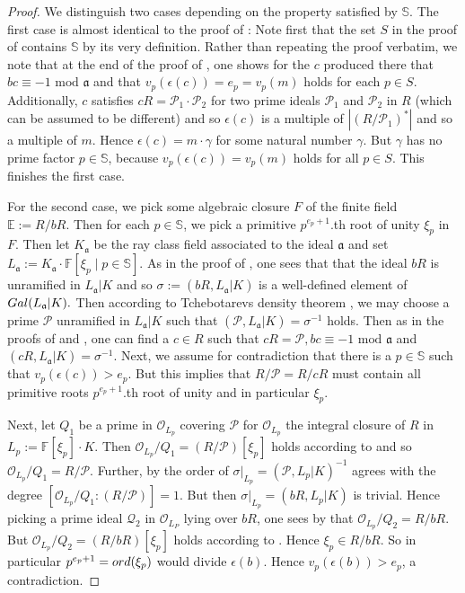 \documentclass[12pt]{amsart}
\newcommand{\C}[1]{{\mathcal #1}}
\theoremstyle{definition}\newtheorem{definition}[theorem]{Definition}
\theoremstyle{remark}\newtheorem{remark}[theorem]{Remark}
\theoremstyle{definition}\newtheorem{case}{Case}
\begin{document}
\begin{proof}
We distinguish two cases depending on the property satisfied by $\mathbb{S}$. The first case is almost identical to the proof of \cite[Lemma~3.3]{https://doi.org/10.1112/blms.12925}: Note first that the set $S$ in the proof of \cite[Lemma~3.3]{https://doi.org/10.1112/blms.12925} contains $\mathbb{S}$ by its very definition. Rather than repeating the proof verbatim, we note that at the end of the proof of \cite[Lemma~3.3]{https://doi.org/10.1112/blms.12925}, one shows for the $c$ produced there that $bc\equiv -1\text{ mod }\mathfrak{a}$ and that $v_p(\epsilon(c))=e_p=v_p(m)$ holds for each 
$p\in S$. Additionally, $c$ satisfies $cR=\C P_1\cdot\C P_2$ for two prime ideals $\C P_1$ and $\C P_2$ in $R$ (which can be assumed to be different) and so $\epsilon(c)$ is a multiple of $|(R/\C P_1)^*|$ and so a multiple of $m.$ Hence $\epsilon(c)=m\cdot\gamma$ for some natural number $\gamma.$ But $\gamma$ has no prime factor $p\in\mathbb{S}$, because $v_p(\epsilon(c))=v_p(m)$ holds for all $p\in S$. This finishes the first case.

For the second case, we pick some algebraic closure $F$ of the finite field $\mathbb{E}:=R/bR$. Then for each $p\in\mathbb{S}$, we pick a primitive $p^{e_p+1}$.th root of unity $\xi_p$ in $F.$ Then let $K_{\mathfrak{a}}$ be the ray class field associated to the ideal $\mathfrak{a}$ and set $L_{\mathfrak{a}}:=K_{\mathfrak{a}}\cdot\mathbb{F}[\xi_p\mid p\in\mathbb{S}].$ As in the proof of \cite[Lemma~3.3]{https://doi.org/10.1112/blms.12925}, one sees that that the ideal $bR$ is unramified in $L_{\mathfrak{a}}|K$ and so $\sigma:=(bR,L_{\mathfrak{a}}|K)$ is a well-defined element of ${\rm Gal}(L_{\mathfrak{a}}|K).$ Then according to Tchebotarevs density theorem \cite[Theorem~9.13A]{MR1876657}, we may choose a prime $\C P$ unramified in $L_{\mathfrak{a}}|K$ such that $(\C P,L_{\mathfrak{a}}|K)=\sigma^{-1}$ holds. Then as in the proofs of \cite[Lemma~4.3]{gvozdevsky2023width} and \cite[Lemma~3.3]{https://doi.org/10.1112/blms.12925}, one can find a $c\in R$ such that $cR=\C P,bc\equiv -1\text{ mod }\mathfrak{a}$ and $(cR,L_{\mathfrak{a}}|K)=\sigma^{-1}$. Next, we assume for contradiction that there is a $p\in\mathbb{S}$ such that $v_p(\epsilon(c))>e_p.$ But this implies that $R/\C P=R/cR$ must contain all primitive roots $p^{e_p+1}$.th root of unity and in particular $\xi_p$.

Next, let $Q_1$ be a prime in $\C O_{L_p}$ covering $\C P$ for $\C O_{L_p}$ the integral closure of $R$ in $L_p:=\mathbb{F}[\xi_p]\cdot K.$ Then $\C O_{L_p}/Q_1=(R/\C P)[\xi_p]$ holds according to \cite[Proposition~8.10]{MR1876657} and so $\C O_{L_p}/Q_1=R/\C P$. Further, by \cite[Proposition~9.10]{MR1876657} the order of $\sigma|_{L_p}=(\C P,L_p|K)^{-1}$ agrees with the degree $[\C O_{L_p}/Q_1:(R/\C P)]=1.$ But then $\sigma|_{L_p}=(bR,L_p|K)$ is trivial. Hence picking a prime ideal $\C Q_2$ in $\C O_{L_P}$ lying over $bR$, one sees by \cite[Proposition~9.10]{MR1876657} that $\C O_{L_p}/Q_2=R/bR$. But $\C O_{L_p}/Q_2=(R/bR)[\xi_p]$ holds according to \cite[Proposition~8.10]{MR1876657}. Hence $\xi_p\in R/bR.$ So in particular $p^{e_p+1}={\rm ord}(\xi_p)$ would divide $\epsilon(b).$ Hence $v_p(\epsilon(b))>e_p$, a contradiction. 


\end{proof}
\end{document}
